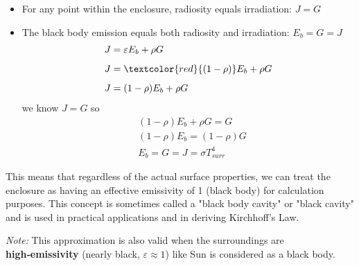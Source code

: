     \begin{itemize}
        \item For any point within the enclosure, radiosity equals irradiation: $J = G$
        \item The black body emission equals both radiosity and irradiation: $E_b = G = J$
        \[
            \begin{aligned}
                &J =\varepsilon E_b+ \rho G
                \\[0.5em]
                &J = \textcolor{red}{(1-\rho)} E_b+ \rho G
                \\[0.5em]
                &J  = (1-\rho) E_b+\rho G
            \end{aligned}
        \]
     we know $J=G$ so
     \[
        \begin{aligned}
            &(1-\rho) E_b+\rho G = G
            \\[0.5em]
            & (1-\rho) E_b  =(1-\rho) G
            \\[0.5em]
            & E_b  =G=J = \sigma T_{surr}^4
        \end{aligned}
     \]
    \end{itemize}
    
    This means that regardless of the actual surface properties, we can treat the enclosure as having an effective emissivity of 1 (black body) for calculation purposes. This concept is sometimes called a "black body cavity" or "black cavity" and is used in practical applications and in deriving Kirchhoff's Law.

    \textbf{
    }

    \textit{Note:} This approximation is also valid  when the surroundings are \textbf{high‑emissivity} (nearly black, $\varepsilon\!\approx\!1$) like Sun is considered as a black body.
%


